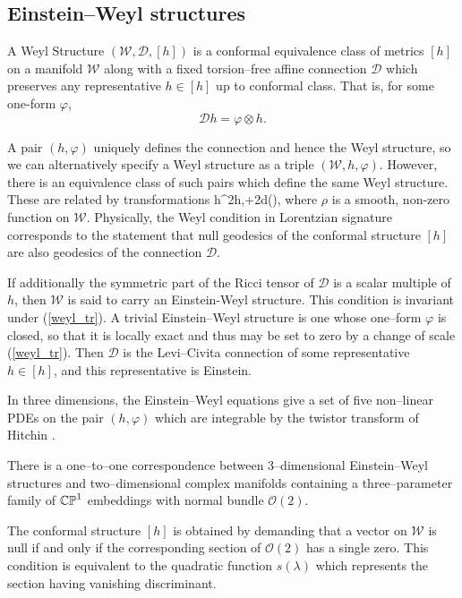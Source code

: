 \subsection{Einstein--Weyl structures}
\begin{defi}
A Weyl Structure $(\mathcal{W},\mathscr{D},[h])$ is a conformal equivalence class of metrics $[h]$ on a manifold $\mathcal{W}$ along with a fixed torsion--free affine connection $\mathscr{D}$ which preserves any representative $h\in[h]$ up to conformal class. That is, for some one-form $\varphi$,
\[
\mathscr{D}h=\varphi\otimes h.
\]
\end{defi}
A pair $(h,\varphi)$ uniquely defines the connection and hence the Weyl structure, so we can alternatively specify a Weyl structure as a triple $(\mathcal{W},h,\varphi)$. However, there is an equivalence class of such pairs which define the same Weyl structure. These are related by transformations
\be
\label{weyl_tr}
h\rightarrow \rho^2h,\quad\varphi\rightarrow\varphi+2d(\rho),
\ee
where $\rho$ is a smooth, non-zero function on $\mathcal{W}$. 
Physically, the Weyl condition in Lorentzian signature corresponds to the statement that null geodesics of the conformal structure $[h]$ are also geodesics of the connection $\mathscr{D}$.

If additionally the symmetric part of the Ricci tensor of $\mathscr{D}$ is a scalar multiple of $h$, then $\mathcal{W}$ is said to carry an Einstein-Weyl structure.
This condition is invariant under (\ref{weyl_tr}). A trivial Einstein--Weyl structure is one whose one--form $\varphi$ is closed, so that it is locally exact and thus may be set to zero by a change of scale (\ref{weyl_tr}). Then $\mathscr{D}$ is the Levi--Civita connection of some representative $h\in[h]$, and this representative is Einstein.

In three dimensions, the Einstein--Weyl equations give a set of five non--linear PDEs on the pair $(h, \varphi)$ which are integrable by the twistor transform of Hitchin \cite{hitchin}.
\begin{theo}
There is a one--to--one correspondence between 3--dimensional Einstein--Weyl structures and two--dimensional complex manifolds containing a three--parameter family of $\mathbb{CP}^1$ embeddings with normal bundle $\mathcal{O}(2)$.
\end{theo}
\noindent The conformal structure $[h]$ is obtained by demanding that a vector on $\mathcal{W}$ is null if and only if the corresponding section of $\mathcal{O}(2)$ has a single zero. This condition is equivalent to the quadratic function $s(\lambda)$ which represents the section having vanishing discriminant.

